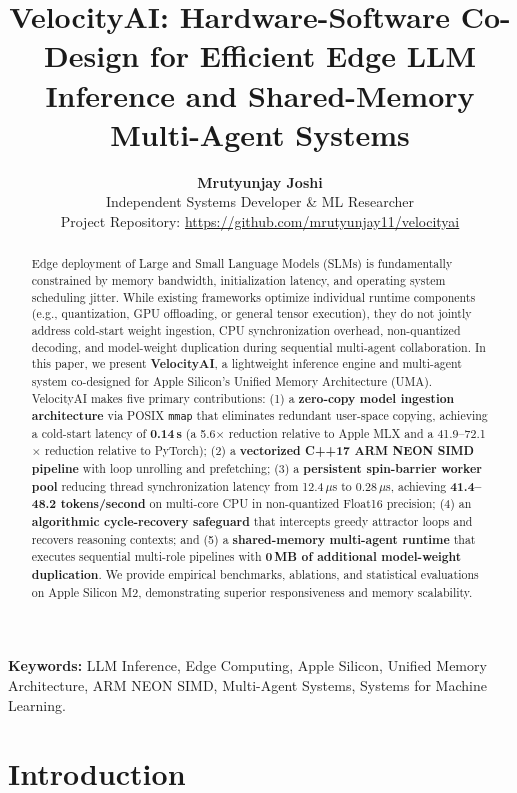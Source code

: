 \documentclass[10pt,twocolumn]{article}
\title{\textbf{\Large VelocityAI: Hardware-Software Co-Design for Efficient Edge LLM Inference and Shared-Memory Multi-Agent Systems}}
\author{
    \textbf{Mrutyunjay Joshi} \\
    Independent Systems Developer \& ML Researcher \\
    Project Repository: \url{https://github.com/mrutyunjay11/velocityai}
}
\date{}
\begin{document}
\maketitle

\begin{abstract}
\noindent Edge deployment of Large and Small Language Models (SLMs) is fundamentally constrained by memory bandwidth, initialization latency, and operating system scheduling jitter. While existing frameworks optimize individual runtime components (e.g., quantization, GPU offloading, or general tensor execution), they do not jointly address cold-start weight ingestion, CPU synchronization overhead, non-quantized decoding, and model-weight duplication during sequential multi-agent collaboration. In this paper, we present \textbf{VelocityAI}, a lightweight inference engine and multi-agent system co-designed for Apple Silicon's Unified Memory Architecture (UMA). VelocityAI makes five primary contributions: (1) a \textbf{zero-copy model ingestion architecture} via POSIX \texttt{mmap} that eliminates redundant user-space copying, achieving a cold-start latency of \textbf{0.14\,s} (a 5.6$\times$ reduction relative to Apple MLX and a 41.9--72.1$\times$ reduction relative to PyTorch); (2) a \textbf{vectorized C++17 ARM NEON SIMD pipeline} with loop unrolling and prefetching; (3) a \textbf{persistent spin-barrier worker pool} reducing thread synchronization latency from 12.4\,$\mu$s to 0.28\,$\mu$s, achieving \textbf{41.4--48.2 tokens/second} on multi-core CPU in non-quantized Float16 precision; (4) an \textbf{algorithmic cycle-recovery safeguard} that intercepts greedy attractor loops and recovers reasoning contexts; and (5) a \textbf{shared-memory multi-agent runtime} that executes sequential multi-role pipelines with \textbf{0\,MB of additional model-weight duplication}. We provide empirical benchmarks, ablations, and statistical evaluations on Apple Silicon M2, demonstrating superior responsiveness and memory scalability.
\end{abstract}

\vspace{0.3em}
\noindent \textbf{Keywords:} LLM Inference, Edge Computing, Apple Silicon, Unified Memory Architecture, ARM NEON SIMD, Multi-Agent Systems, Systems for Machine Learning.
\vspace{0.6em}

\section{Introduction}
\end{document}
